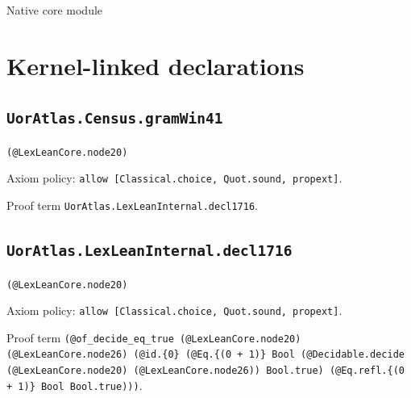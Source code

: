 \documentclass[11pt]{article}
\begin{document}
\begin{center}{\LARGE Native core module}\end{center}
\section*{Kernel-linked declarations}
\subsection*{\texttt{UorAtlas.Census.gramWin41}}
\noindent\texttt{(@LexLeanCore.node20)}\par
\noindent Axiom policy: \texttt{allow [Classical.choice, Quot.sound, propext]}.\par
\noindent Proof term \texttt{UorAtlas.LexLeanInternal.decl1716}.\par
\subsection*{\texttt{UorAtlas.LexLeanInternal.decl1716}}
\noindent\texttt{(@LexLeanCore.node20)}\par
\noindent Axiom policy: \texttt{allow [Classical.choice, Quot.sound, propext]}.\par
\noindent Proof term \texttt{(@of\_decide\_eq\_true (@LexLeanCore.node20) (@LexLeanCore.node26) (@id.\{0\} (@Eq.\{(0 + 1)\} Bool (@Decidable.decide (@LexLeanCore.node20) (@LexLeanCore.node26)) Bool.true) (@Eq.refl.\{(0 + 1)\} Bool Bool.true)))}.\par
\end{document}
